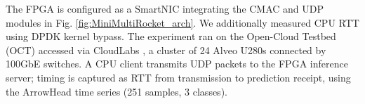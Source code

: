 The FPGA is configured as a SmartNIC integrating the CMAC and UDP modules in Fig. \ref{fig:MiniMultiRocket_arch}. We additionally measured CPU RTT using DPDK kernel bypass. The experiment ran on the Open-Cloud Testbed (OCT) \cite{oct, networkfpga} accessed via CloudLabs \cite{CloudLabs}, a cluster of 24 Alveo U280s connected by 100GbE switches. A CPU client transmits UDP packets to the FPGA inference server; timing is captured as RTT from transmission to prediction receipt, using the ArrowHead time series (251 samples, 3 classes).


